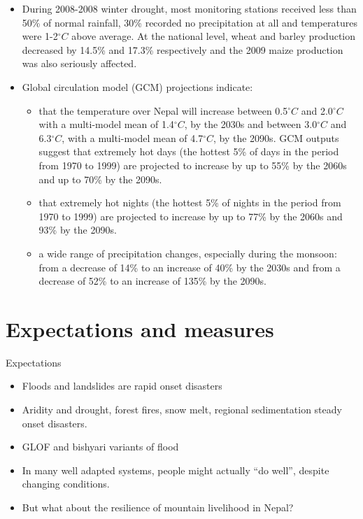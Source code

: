 \documentclass[
  ignorenonframetext,
  aspectratio=169]{beamer}
\providecommand{\tightlist}{%
  \setlength{\itemsep}{0pt}\setlength{\parskip}{0pt}}
\begin{document}
\begin{frame}{}
\protect\hypertarget{section-9}{}
\begin{itemize}
\tightlist
\item
  During 2008-2008 winter drought, most monitoring stations received
  less than 50\% of normal rainfall, 30\% recorded no precipitation at
  all and temperatures were 1-2\(^\circ C\) above average. At the
  national level, wheat and barley production decreased by 14.5\% and
  17.3\% respectively and the 2009 maize production was also seriously
  affected.
\item
  Global circulation model (GCM) projections indicate:

  \begin{itemize}
  \tightlist
  \item
    that the temperature over Nepal will increase between
    0.5\(^\circ C\) and 2.0\(^\circ C\) with a multi-model mean of
    1.4\(^\circ C\), by the 2030s and between 3.0\(^\circ C\) and
    6.3\(^\circ C\), with a multi-model mean of 4.7\(^\circ C\), by the
    2090s. GCM outputs suggest that extremely hot days (the hottest 5\%
    of days in the period from 1970 to 1999) are projected to increase
    by up to 55\% by the 2060s and up to 70\% by the 2090s.
  \item
    that extremely hot nights (the hottest 5\% of nights in the period
    from 1970 to 1999) are projected to increase by up to 77\% by the
    2060s and 93\% by the 2090s.
  \item
    a wide range of precipitation changes, especially during the
    monsoon: from a decrease of 14\% to an increase of 40\% by the 2030s
    and from a decrease of 52\% to an increase of 135\% by the 2090s.
  \end{itemize}
\end{itemize}
\end{frame}

\hypertarget{expectations-and-measures}{%
\section{Expectations and measures}\label{expectations-and-measures}}

\begin{frame}{Expectations}
\protect\hypertarget{expectations}{}
\begin{itemize}
\tightlist
\item
  Floods and landslides are rapid onset disasters
\item
  Aridity and drought, forest fires, snow melt, regional sedimentation
  steady onset disasters.
\item
  GLOF and bishyari variants of flood
\item
  In many well adapted systems, people might actually ``do well'',
  despite changing conditions.
\item
  But what about the resilience of mountain livelihood in Nepal?
\end{itemize}
\end{frame}
\end{document}
